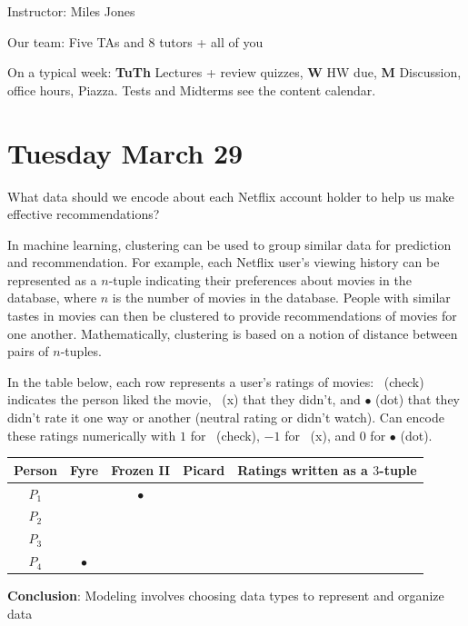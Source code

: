 \documentclass[12pt, oneside]{article}
\newcommand{\cmark}{\ding{51}}
\newcommand{\xmark}{\ding{55}}
\begin{document}
Instructor: Miles Jones

Our team: Five TAs and 8 tutors + all of you




On a typical week: {\bf TuTh} Lectures + review quizzes, {\bf W} HW due, {\bf M} Discussion, office hours, Piazza. 
Tests and Midterms see the content calendar.





\newpage
\section*{Tuesday March 29}


What data should we encode about each Netflix account holder to help us make effective recommendations?

\vfill
\vfill

In machine learning, clustering can be used to group similar data for prediction and recommendation.  For example,
each Netflix user's viewing history can be represented as a $n$-tuple indicating their preferences about
movies in the database, where $n$ is the number of movies in the database.  People with similar tastes in movies can then be clustered to provide recommendations
of movies for one another.  Mathematically, clustering is based on a notion of distance between pairs of $n$-tuples.
 

In the table  below,  each row represents a user's ratings of movies: 
\cmark~(check) indicates the person liked the movie, \xmark~(x)
that they didn't, and $\bullet$ (dot) that they didn't rate it one way or 
another (neutral rating or didn't watch). Can encode
these ratings numerically with $1$ for \cmark~(check), $-1$ for \xmark~(x), 
and $0$ for $\bullet$ (dot).

\begin{center}
\begin{tabular}{c|ccc||c}
Person & Fyre & Frozen II & Picard & Ratings written as a  $3$-tuple\\
\hline
$P_1$     & \xmark & $\bullet$ & \cmark & \phantom{$(-1, 0, 1)$} \\
$P_2$     & \cmark & \cmark & \xmark & \phantom{$(1, 1, -1)$} \\
$P_3$     & \cmark & \cmark & \cmark & \phantom{$(1, 1, 1)$} \\
$P_4$     & $\bullet$ & \xmark & \cmark &  \\
\end{tabular}
\end{center} 
{\bf Conclusion}: Modeling involves choosing data types to represent and organize data
\end{document}
